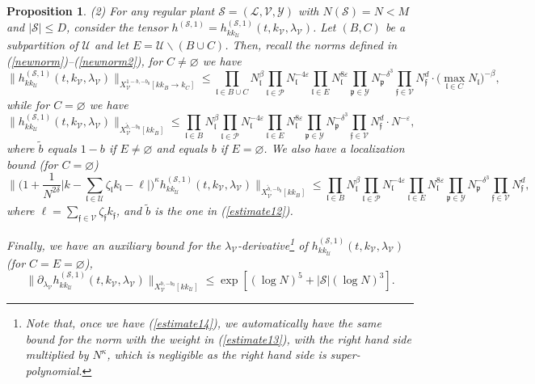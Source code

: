 \documentclass[11 pt,reqno]{amsart}
\newtheorem{prop}[thm]{Proposition}
\theoremstyle{definition}
\theoremstyle{remark}
\numberwithin{equation}{section}
\newcommand{\Sc}{\mathcal{S}}
\newcommand{\Lc}{\mathcal{L}}
\newcommand{\Pc}{\mathcal{P}}
\newcommand{\Uc}{\mathcal{U}}
\newcommand{\Vc}{\mathcal{V}}
\newcommand{\Yc}{\mathcal{Y}}
\newcommand{\pf}{\mathfrak{p}}
\newcommand{\ff}{\mathfrak{f}}
\newcommand{\lf}{\mathfrak{l}}
\begin{document}
{\begin{prop}
 (2) For any regular plant $\Sc=(\Lc,\Vc,\Yc)$ with $N(\Sc)=N< M$ and $|\Sc|\leq D$, consider the tensor $h^{(\Sc,1)}=h_{kk_\Uc}^{(\Sc,1)}(t,k_\Vc,\lambda_\Vc)$. Let $(B,C)$ be a subpartition of $\Uc$ and let $E=\Uc\backslash(B\cup C)$. Then, recall the norms defined in (\ref{newnorm})--(\ref{newnorm2}), for $C\neq\varnothing$ we have \begin{equation}\label{estimate11}\|h_{kk_\Uc}^{(\Sc,1)}(t,k_\Vc,\lambda_\Vc)\|_{X_\Vc^{1-b,-b_0}[kk_B\to k_C]}\leq\prod_{\lf\in B\cup C}N_\lf^\beta\prod_{\lf\in\Pc}N_\lf^{-4\varepsilon}\prod_{\lf\in E}N_\lf^{8\varepsilon}\prod_{\pf\in\Yc}N_\pf^{-\delta^3}\prod_{\ff \in \Vc} N_\ff^d
 \cdot 
\big(\max_{\lf\in C}N_\lf\big)^{-\beta},
 \end{equation} while for $C=\varnothing$ we have
 \begin{equation}
 \label{estimate12}\|h_{kk_\Uc}^{(\Sc,1)}(t,k_\Vc,\lambda_\Vc)\|_{X_\Vc^{\widetilde{b},-b_0}[kk_B]}\leq\prod_{\lf\in B}N_\lf^\beta\prod_{\lf\in\Pc}N_\lf^{-4\varepsilon}\prod_{\lf\in E}N_\lf^{8\varepsilon}\prod_{\pf\in\Yc}N_\pf^{-\delta^3}\prod_{\ff \in \Vc} N_\ff^d\cdot N^{-\varepsilon},
 \end{equation} where $\widetilde{b}$ equals $1-b$ if $E\neq \varnothing$ and equals $b$ if $E=\varnothing$. We also have a localization bound (for $C=\varnothing$)
 \begin{equation} \label{estimate13}\bigg\|\bigg(1+\frac{1}{N^{2\delta}}\big|k-\sum_{\lf\in\Uc}\zeta_\lf k_\lf-\ell\big|\bigg)^\kappa h_{kk_\Uc}^{(\Sc,1)}(t,k_\Vc,\lambda_\Vc)\bigg\|_{X_\Vc^{\widetilde{b},-b_0}[kk_B]}\leq\prod_{\lf\in B}N_\lf^\beta\prod_{\lf\in\Pc}N_\lf^{-4\varepsilon}\prod_{\lf\in E}N_\lf^{8\varepsilon}\prod_{\pf\in\Yc}N_\pf^{-\delta^3}\prod_{\ff \in \Vc} N_\ff^d,
 \end{equation} where $\ell=\sum_{\ff\in\Vc}\zeta_\ff k_\ff$, and $\widetilde{b}$ is the one in (\ref{estimate12}).
 
 Finally, we have an auxiliary bound for the $\lambda_\Vc$-derivative\footnote{Note that, once we have (\ref{estimate14}), we automatically have the same bound for the norm with the weight in (\ref{estimate13}), with the right hand side multiplied by $N^\kappa$, which is negligible as the right hand side is super-polynomial.} of $h_{kk_\Uc}^{(\Sc,1)}(t,k_\Vc,\lambda_\Vc)$ (for $C=E=\varnothing$),
  \begin{equation} \label{estimate14}\|\partial_{\lambda_\Vc}h_{kk_\Uc}^{(\Sc,1)}(t,k_\Vc,\lambda_\Vc)\|_{X_\Vc^{b,-b_0}[kk_\Uc]}\leq \exp[(\log N)^5+|\Sc|(\log N)^3].
 \end{equation}
 

\end{prop}}
\end{document}
